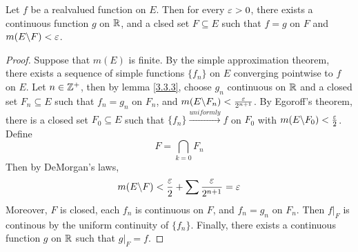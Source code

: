 \begin{theorem}\label{3.3.4}
    Let $f$ be a realvalued function on  $E$. Then for every  $\varepsilon>0$, there exists a
    continuous function  $g$ on  $\mathbb{R}$, and a clsed set  $F \subseteq E$ such
    that  $f=g$ on  $F$ and  $m(E\backslash F)<\varepsilon$.
\end{theorem}
\begin{proof}
    Suppose that $m(E)$ is finite. By the simple approximation theorem, there
    exists a sequence of simple functions $\{f_n\}$ on $E$ converging pointwise
    to  $f$ on  $E$. Let  $n \in \mathbb{Z}^+$, then by lemma \ref{3.3.3}, choose $g_n$
    continuous on  $\mathbb{R}$ and a closed set  $F_n \subseteq E$ such that  $f_n=g_n$
    on  $F_n$, and  $m(E\backslash F_n)<\frac{\varepsilon}{2^{n+1}}$. By Egoroff's theorem,
    there is a closed set $F_0 \subseteq E$ such that $\{f_n\}
    \xrightarrow{uniformly} f$ on $F_0$ with $m(E\backslash F_0)<\frac{\varepsilon}{2}$.
    Define
    \begin{equation*}
        F=\bigcap_{k=0}{F_n}
    \end{equation*}
    Then by DeMorgan's laws,
    \begin{equation*}
        m(E\backslash F)<\frac{\varepsilon}{2}+\sum{\frac{\varepsilon}{2^{n+1}}}=\varepsilon
    \end{equation*}
    Moreover, $F$ is closed, each  $f_n$ is continuous on  $F$, and  $f_n=g_n$
    on  $F_n$. Then  $f|_F$ is continous by the uniform continuity of
    $\{f_n\}$. Finally, there exists a continuous function $g$ on  $\mathbb{R}$ such
    that $g|_F=f$.
\end{proof}
